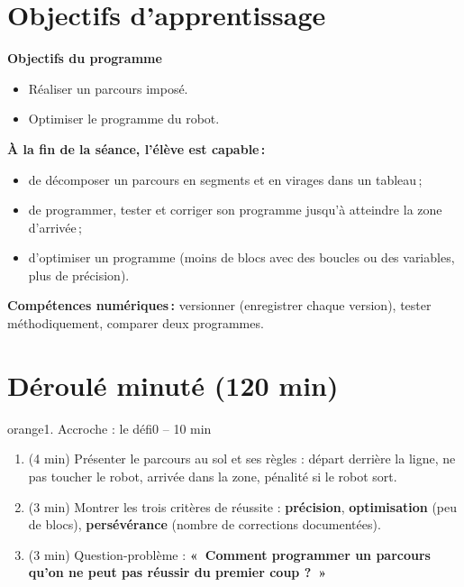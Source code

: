 \documentclass[11pt,a4paper]{article}
\begin{document}
\section{Objectifs d'apprentissage}
\begin{tcolorbox}[colback=gray!8,colframe=gray!60!black,arc=1mm,boxrule=0.5pt]
\textbf{Objectifs du programme}
\begin{itemize}
 \item Réaliser un parcours imposé.
 \item Optimiser le programme du robot.
\end{itemize}
\textbf{À la fin de la séance, l'élève est capable\,:}
\begin{itemize}
 \item de décomposer un parcours en segments et en virages dans un tableau\,;
 \item de programmer, tester et corriger son programme jusqu'à atteindre la zone d'arrivée\,;
 \item d'optimiser un programme (moins de blocs avec des boucles ou des variables, plus de précision).
\end{itemize}
\textbf{Compétences numériques\,:} versionner (enregistrer chaque version), tester méthodiquement, comparer deux programmes.
\end{tcolorbox}

\section{Déroulé minuté (120 min)}

\begin{etape}{orange}{1. Accroche : le défi}{0 -- 10 min}
\begin{enumerate}
 \item (4 min) Présenter le parcours au sol et ses règles : départ derrière la ligne, ne pas toucher le robot, arrivée dans la zone, pénalité si le robot sort.
 \item (3 min) Montrer les trois critères de réussite : \textbf{précision}, \textbf{optimisation} (peu de blocs), \textbf{persévérance} (nombre de corrections documentées).
 \item (3 min) Question-problème : \textbf{«~Comment programmer un parcours qu'on ne peut pas réussir du premier coup ?~»}
\end{enumerate}
\end{etape}
\end{document}
